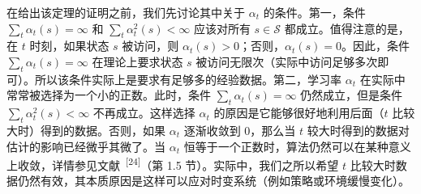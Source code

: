 在给出该定理的证明之前，我们先讨论其中关于 $\alpha_t$ 的条件。第一，条件 $\sum_t \alpha_t(s) = \infty$ 和 $\sum_t \alpha_t^2(s) < \infty$ 应该对所有 $s \in \mathcal{S}$ 都成立。值得注意的是，在 $t$ 时刻，如果状态 $s$ 被访问，则 $\alpha_t(s) > 0$；否则，$\alpha_t(s) = 0$。因此，条件 $\sum_t \alpha_t(s) = \infty$ 在理论上要求状态 $s$ 被访问无限次（实际中访问足够多次即可）。所以该条件实际上是要求有足够多的经验数据。第二，学习率 $\alpha_t$ 在实际中常常被选择为一个小的正数。此时，条件 $\sum_t \alpha_t(s) = \infty$ 仍然成立，但是条件 $\sum_t \alpha_t^2(s) < \infty$ 不再成立。这样选择 $\alpha_t$ 的原因是它能够很好地利用后面（$t$ 比较大时）得到的数据。否则，如果 $\alpha_t$ 逐渐收敛到 $0$，那么当 $t$ 较大时得到的数据对估计的影响已经微乎其微了。当 $\alpha_t$ 恒等于一个正数时，算法仍然可以在某种意义上收敛，详情参见文献~\textsuperscript{[24]}（第 1.5 节）。实际中，我们之所以希望 $t$ 比较大时数据仍然有效，其本质原因是这样可以应对时变系统（例如策略或环境缓慢变化）。

